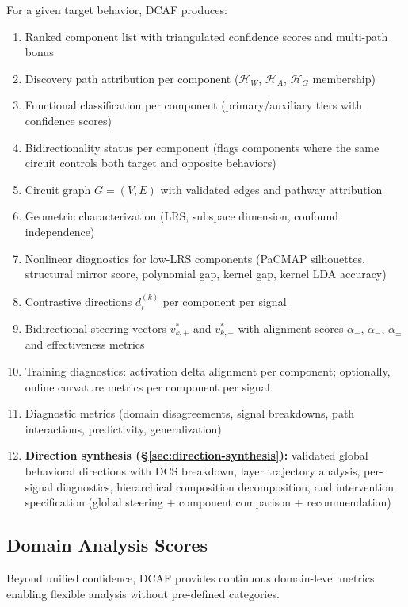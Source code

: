\documentclass[11pt]{article}
\begin{document}
For a given target behavior, DCAF produces:
\begin{enumerate}[nosep]
\item Ranked component list with triangulated confidence scores and multi-path bonus
\item Discovery path attribution per component ($\mathcal{H}_W$, $\mathcal{H}_A$, $\mathcal{H}_G$ membership)
\item Functional classification per component (primary/auxiliary tiers with confidence scores)
\item Bidirectionality status per component (flags components where the same circuit controls both target and opposite behaviors)
\item Circuit graph $G = (V, E)$ with validated edges and pathway attribution
\item Geometric characterization (LRS, subspace dimension, confound independence)
\item Nonlinear diagnostics for low-LRS components (PaCMAP silhouettes, structural mirror score, polynomial gap, kernel gap, kernel LDA accuracy)
\item Contrastive directions $d^{(k)}_i$ per component per signal
\item Bidirectional steering vectors $v^*_{k,+}$ and $v^*_{k,-}$ with alignment scores $\alpha_+$, $\alpha_-$, $\alpha_\pm$ and effectiveness metrics
\item Training diagnostics: activation delta alignment per component; optionally, online curvature metrics per component per signal
\item Diagnostic metrics (domain disagreements, signal breakdowns, path interactions, predictivity, generalization)
\item \textbf{Direction synthesis (\S\ref{sec:direction-synthesis}):} validated global behavioral directions with DCS breakdown, layer trajectory analysis, per-signal diagnostics, hierarchical composition decomposition, and intervention specification (global steering + component comparison + recommendation)
\end{enumerate}

\subsection{Domain Analysis Scores}
\label{app:output-domain-analysis-scores}

Beyond unified confidence, DCAF provides continuous domain-level metrics enabling flexible analysis without pre-defined categories.
\end{document}
